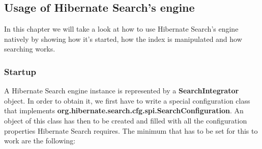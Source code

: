 \pagebreak

\subsection{Usage of Hibernate Search's engine} \label{using_hsearch_engine}
In this chapter we will take a look at how to use Hibernate Search's engine natively by showing how it's started, how the index is manipulated and how searching works.

\subsubsection{Startup}
A Hibernate Search engine instance is represented by a \textbf{SearchIntegrator} object. In order to obtain it, we first have to write a special configuration class that implements \textbf{org.hibernate.search.cfg.spi.SearchConfiguration}. An object of this class has then to be created and filled with all the configuration properties Hibernate Search requires. The minimum that has to be set for this to work are the following:

